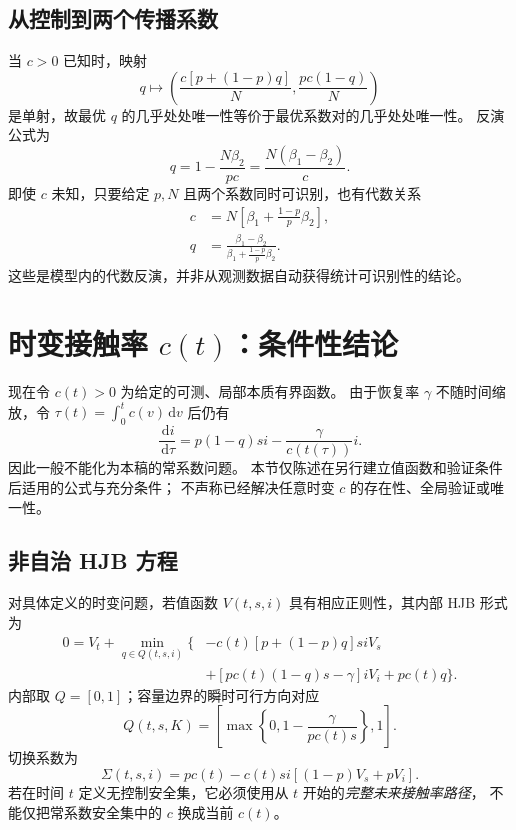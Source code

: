 \documentclass[11pt,a4paper,UTF8]{ctexart}
\theoremstyle{definition}
\newcommand{\dd}{\,\mathrm d}
\begin{document}
\subsection{从控制到两个传播系数}
当 $c>0$ 已知时，映射
\begin{equation}
q\mapsto\left(\frac{c[p+(1-p)q]}N,\frac{pc(1-q)}N\right)
\label{eq:q-to-betas}
\end{equation}
是单射，故最优 $q$ 的几乎处处唯一性等价于最优系数对的几乎处处唯一性。
反演公式为
\begin{equation}
q=1-\frac{N\beta_2}{pc}=\frac{N(\beta_1-\beta_2)}c.
\label{eq:q-inversion-known-c}
\end{equation}
即使 $c$ 未知，只要给定 $p,N$ 且两个系数同时可识别，也有代数关系
\begin{align}
c&=N\left[\beta_1+\frac{1-p}{p}\beta_2\right],\label{eq:c-inversion}\\
q&=\frac{\beta_1-\beta_2}{\beta_1+\frac{1-p}{p}\beta_2}.\label{eq:q-inversion}
\end{align}
这些是模型内的代数反演，并非从观测数据自动获得统计可识别性的结论。

\ifdefined\TheoryOnly\else
\section{\texorpdfstring{时变接触率 $c(t)$：条件性结论}{时变接触率：条件性结论}}
\label{sec:time-varying}
现在令 $c(t)>0$ 为给定的可测、局部本质有界函数。
由于恢复率 $\gamma$ 不随时间缩放，令 $\tau(t)=\int_0^t c(v)\dd v$ 后仍有
\[
\frac{\dd i}{\dd\tau}=p(1-q)si-\frac{\gamma}{c(t(\tau))}i.
\]
因此一般不能化为本稿的常系数问题。
本节仅陈述在另行建立值函数和验证条件后适用的公式与充分条件；
不声称已经解决任意时变 $c$ 的存在性、全局验证或唯一性。

\subsection{非自治 HJB 方程}
对具体定义的时变问题，若值函数 $V(t,s,i)$ 具有相应正则性，其内部 HJB 形式为
\begin{equation}
\begin{aligned}
0=V_t+\min_{q\in Q(t,s,i)}\Big\{&-c(t)[p+(1-p)q]siV_s\\
&+[pc(t)(1-q)s-\gamma]iV_i+pc(t)q\Big\}.
\end{aligned}
\label{eq:time-HJB}
\end{equation}
内部取 $Q=[0,1]$；容量边界的瞬时可行方向对应
\begin{equation}
Q(t,s,K)=\left[\max\left\{0,1-\frac{\gamma}{pc(t)s}\right\},1\right].
\label{eq:time-boundary-set}
\end{equation}
切换系数为
\begin{equation}
\Sigma(t,s,i)=pc(t)-c(t)si[(1-p)V_s+pV_i].
\label{eq:time-switch}
\end{equation}
若在时间 $t$ 定义无控制安全集，它必须使用从 $t$ 开始的\emph{完整未来接触率路径}，
不能仅把常系数安全集中的 $c$ 换成当前 $c(t)$。
\end{document}
